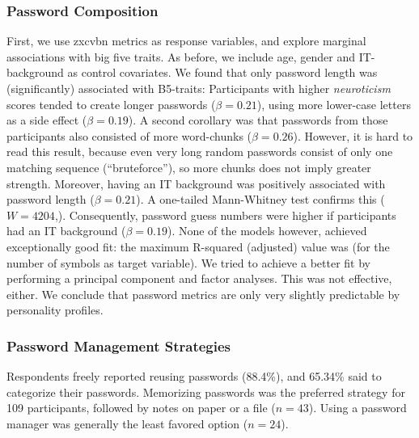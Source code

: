 \subsubsection{Password Composition}
First, we use zxcvbn metrics as response variables, and explore marginal associations with big five traits. As before, we include age, gender and IT-background as control covariates. We found that only password length was (significantly) associated with B5-traits: Participants with higher \textit{neuroticism} scores tended to create longer passwords ($\beta = 0.21$), using more lower-case letters as a side effect ($\beta = 0.19$). A second corollary was that passwords from those participants also consisted of more word-chunks ($\beta= 0.26$). However, it is hard to read this result, because even very long random passwords consist of only one matching sequence (``bruteforce''), so more chunks does not imply greater strength. 
Moreover, having an IT background was positively associated with password length ($\beta = 0.21$). A one-tailed Mann-Whitney test confirms this ($W=4204$,). Consequently, password guess numbers were higher if participants had an IT background ($\beta=0.19$). None of the models however, achieved exceptionally good fit: the maximum R-squared (adjusted) value was  (for the number of symbols as target variable). We tried to achieve a better fit by performing a principal component and factor analyses. This was not effective, either. We conclude that password metrics are only very slightly predictable by personality profiles. 


\subsubsection{Password Management Strategies}
Respondents freely reported reusing passwords (88.4\%), and 65.34\% said to categorize their passwords. Memorizing passwords was the preferred strategy for 109 participants, followed by notes on paper or a file ($n=43$). Using a password manager was generally the least favored option ($n=24$).

